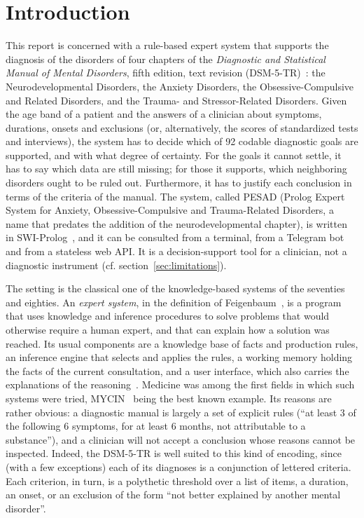 \chapter{Introduction}

This report is concerned with a rule-based expert system that supports the
diagnosis of the disorders of four chapters of the \emph{Diagnostic and
Statistical Manual of Mental Disorders}, fifth edition, text revision
(DSM-5-TR)~\cite{dsm}: the Neurodevelopmental Disorders, the Anxiety Disorders,
the Obsessive-Compulsive and Related Disorders, and the Trauma- and
Stressor-Related Disorders. Given the age band of a patient and the answers of a
clinician about symptoms, durations, onsets and exclusions (or, alternatively,
the scores of standardized tests and interviews), the system has to decide
which of 92 codable diagnostic goals are supported, and with what degree of
certainty. For the goals it cannot settle, it has to say which data are still
missing; for those it supports, which neighboring disorders ought to be ruled
out. Furthermore, it has to justify each conclusion in terms of the criteria of
the manual. The system, called PESAD (Prolog Expert System for Anxiety,
Obsessive-Compulsive and Trauma-Related Disorders, a name that predates the
addition of the neurodevelopmental chapter), is written in
SWI-Prolog~\cite{swipl}, and it can be consulted from a terminal, from a
Telegram bot and from a stateless web API. It is a decision-support tool for a
clinician, not a diagnostic instrument (cf. section~\ref{sec:limitations}).

The setting is the classical one of the knowledge-based systems of the
seventies and eighties. An \emph{expert system}, in the definition of
Feigenbaum~\cite{feigenbaum}, is a program that uses knowledge and inference
procedures to solve problems that would otherwise require a human expert, and
that can explain how a solution was reached. Its usual components are a
knowledge base of facts and production rules, an inference engine that selects
and applies the rules, a working memory holding the facts of the current
consultation, and a user interface, which also carries the explanations of the
reasoning~\cite{jackson,giarratano}. Medicine was among the first fields in
which such systems were tried, MYCIN~\cite{shortliffe-buchanan,mycin} being the
best known example. Its reasons are rather obvious: a diagnostic manual is
largely a set of explicit rules (``at least 3 of the following 6 symptoms, for
at least 6 months, not attributable to a substance''), and a clinician will not
accept a conclusion whose reasons cannot be inspected. Indeed, the DSM-5-TR is well suited to this kind of encoding, since (with a few exceptions) each of its
diagnoses is a conjunction of lettered criteria. Each criterion, in turn, is a
polythetic threshold over a list of items, a duration, an onset, or an exclusion
of the form ``not better explained by another mental disorder''.

